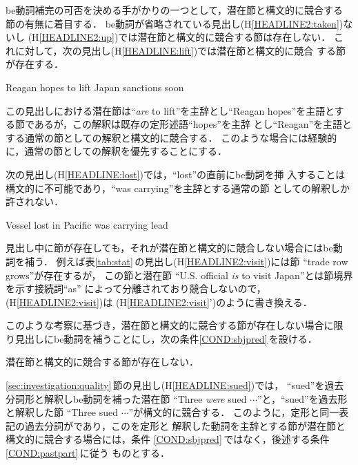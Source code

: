 be動詞補完の可否を決める手がかりの一つとして，潜在節と構文的に競合する
節の有無に着目する．
be動詞が省略されている見出し(H\ref{HEADLINE2:taken})ないし
(H\ref{HEADLINE2:up})では潜在節と構文的に競合する節は存在しない．
これに対して，次の見出し(H\ref{HEADLINE:lift})では潜在節と構文的に競合
する節が存在する．
\begin{HEADLINE}
\headline Reagan hopes to lift Japan sanctions soon
\label{HEADLINE:lift}
\end{HEADLINE}
この見出しにおける潜在節は``{\it are} to lift''を主辞とし``Reagan
hopes''を主語とする節であるが，この解釈は既存の定形述語``hopes''を主辞
とし``Reagan''を主語とする通常の節としての解釈と構文的に競合する．
このような場合には経験的に，通常の節としての解釈を優先することにする．

次の見出し(H\ref{HEADLINE:lost})では，``lost''の直前にbe動詞を挿
入することは構文的に不可能であり，``was carrying''を主辞とする通常の節
としての解釈しか許されない．
\begin{HEADLINE}
\headline Vessel lost in Pacific was carrying lead
\label{HEADLINE:lost}
\end{HEADLINE}

見出し中に節が存在しても，それが潜在節と構文的に競合しない場合にはbe動
詞を補う．
例えば表\ref{tab:stat}\,の見出し(H\ref{HEADLINE2:visit})には節
``trade row grows''が存在するが， この節と潜在節
``U.S. official {\it is} to visit Japan''とは節境界を示す接続詞``as''
によって分離されており競合しないので，(H\ref{HEADLINE2:visit})は
(H\ref{HEADLINE2:visit}')のように書き換える．

このような考察に基づき，潜在節と構文的に競合する節が存在しない場合に限
り見出しにbe動詞を補うことにし，次の条件\ref{COND:sbjpred}\,を設ける．
\begin{COND}
\cond 潜在節と構文的に競合する節が存在しない．
\label{COND:sbjpred}
\end{COND}

\ref{sec:investigation:quality}\,節の見出し(H\ref{HEADLINE:sued})では，
``sued''を過去分詞形と解釈しbe動詞を補った潜在節
``Three {\it were} sued $\cdots$''と，``sued''を過去形と解釈した節
``Three sued $\cdots$''が構文的に競合する．
このように，定形と同一表記の過去分詞が\KEYC であり，この\KEYC を定形と
解釈した動詞を主辞とする節が潜在節と構文的に競合する場合には，条件
\ref{COND:sbjpred}\,ではなく，後述する条件\ref{COND:pastpart}\,に従う
ものとする．

